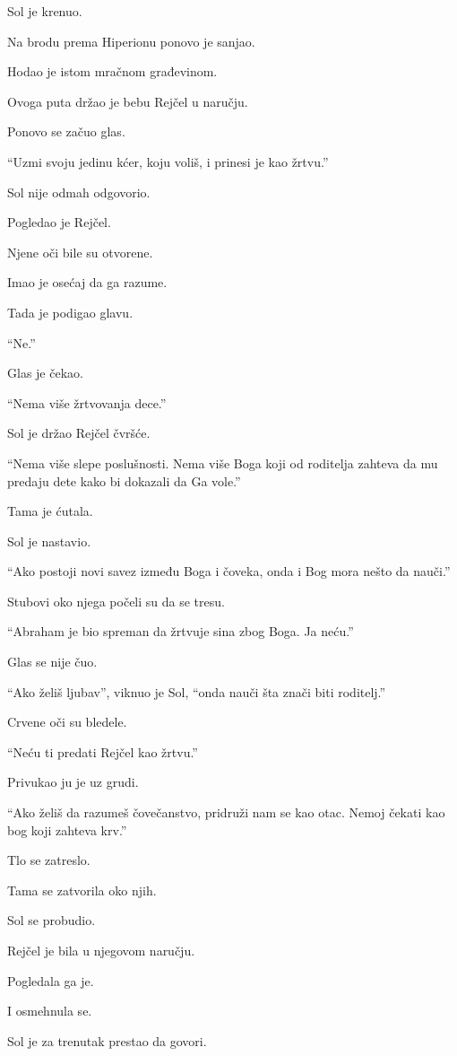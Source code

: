 Sol je krenuo.

\bigskip

Na brodu prema Hiperionu ponovo je sanjao.

Hodao je istom mračnom građevinom.

Ovoga puta držao je bebu Rejčel u naručju.

Ponovo se začuo glas.

``Uzmi svoju jedinu kćer, koju voliš, i prinesi je kao žrtvu.''

Sol nije odmah odgovorio.

Pogledao je Rejčel.

Njene oči bile su otvorene.

Imao je osećaj da ga razume.

Tada je podigao glavu.

``Ne.''

Glas je čekao.

``Nema više žrtvovanja dece.''

Sol je držao Rejčel čvršće.

``Nema više slepe poslušnosti. Nema više Boga koji od roditelja zahteva da mu predaju dete kako bi dokazali da Ga vole.''

Tama je ćutala.

Sol je nastavio.

``Ako postoji novi savez između Boga i čoveka, onda i Bog mora nešto da nauči.''

Stubovi oko njega počeli su da se tresu.

``Abraham je bio spreman da žrtvuje sina zbog Boga. Ja neću.''

Glas se nije čuo.

``Ako želiš ljubav'', viknuo je Sol, ``onda nauči šta znači biti roditelj.''

Crvene oči su bledele.

``Neću ti predati Rejčel kao žrtvu.''

Privukao ju je uz grudi.

``Ako želiš da razumeš čovečanstvo, pridruži nam se kao otac. Nemoj čekati kao bog koji zahteva krv.''

Tlo se zatreslo.

Tama se zatvorila oko njih.

Sol se probudio.

Rejčel je bila u njegovom naručju.

Pogledala ga je.

I osmehnula se.

Sol je za trenutak prestao da govori.

